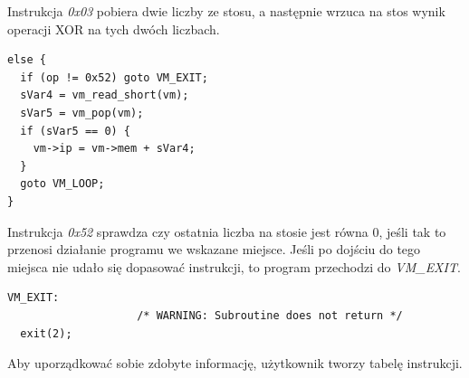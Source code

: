 \documentclass[language=polish,type=eng]{aghmodern}
\begin{document}
Instrukcja \emph{0x03} pobiera dwie liczby ze stosu, a następnie wrzuca na stos wynik operacji
XOR na tych dwóch liczbach.

\begin{verbatim}
else {
  if (op != 0x52) goto VM_EXIT;
  sVar4 = vm_read_short(vm);
  sVar5 = vm_pop(vm);
  if (sVar5 == 0) {
    vm->ip = vm->mem + sVar4;
  }
  goto VM_LOOP;
}
\end{verbatim}

Instrukcja \emph{0x52} sprawdza czy ostatnia liczba na stosie jest równa 0, jeśli tak
to przenosi działanie programu we wskazane miejsce. Jeśli po dojściu do tego miejsca
nie udało się dopasować instrukcji, to program przechodzi do \emph{VM\_EXIT}.

\begin{verbatim}
VM_EXIT:
                    /* WARNING: Subroutine does not return */
  exit(2);
\end{verbatim}

Aby uporządkować sobie zdobyte informację, użytkownik tworzy tabelę instrukcji.

\begin{table}[H]
\caption{Tabela instrukcji maszyny wirtualnej}
\end{table}
\end{document}
